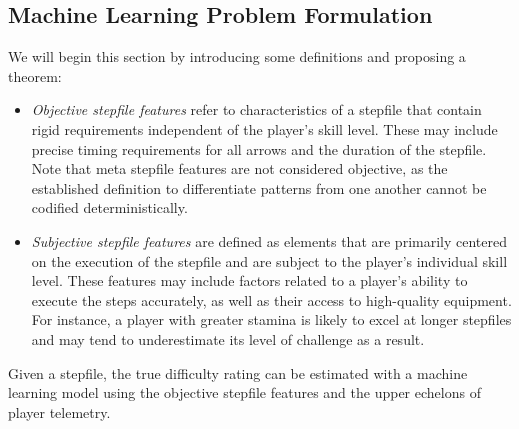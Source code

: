 \subsection{Machine Learning Problem Formulation}

We will begin this section by introducing some definitions and proposing a theorem:

\begin{itemize}
    \item \textit{Objective stepfile features} refer to characteristics of a stepfile that contain rigid requirements independent of the player's skill level. These may include precise timing requirements for all arrows and the duration of the stepfile. Note that meta stepfile features are not considered objective, as the established definition to differentiate patterns from one another cannot be codified deterministically. 
    \item \textit{Subjective stepfile features} are defined as elements that are primarily centered on the execution of the stepfile and are subject to the player's individual skill level. These features may include factors related to a player's ability to execute the steps accurately, as well as their access to high-quality equipment. For instance, a player with greater stamina is likely to excel at longer stepfiles and may tend to underestimate its level of challenge as a result. 
\end{itemize}

\begin{theorem}
Given a stepfile, the true difficulty rating can be estimated with a machine learning model using the objective stepfile features and the upper echelons of player telemetry.
\end{theorem}

